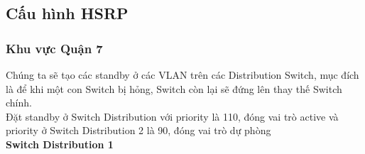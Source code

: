 \documentclass[a4paper, 12pt]{article}
\begin{document}
\subsection{Cấu hình HSRP}
\subsubsection{Khu vực Quận 7}
\hspace*{1cm}Chúng ta sẽ tạo các standby ở các VLAN trên các Distribution Switch, mục đích là để khi một con Switch bị hỏng, Switch còn lại sẽ đứng lên thay thế Switch chính.\\
\hspace*{1cm}Đặt standby ở Switch Distribution với priority là 110, đóng vai trò active và priority ở Switch Distribution 2 là 90, đóng vai trò dự phòng\\
\hspace*{1cm}\textbf{Switch Distribution 1}\\
\end{document}
